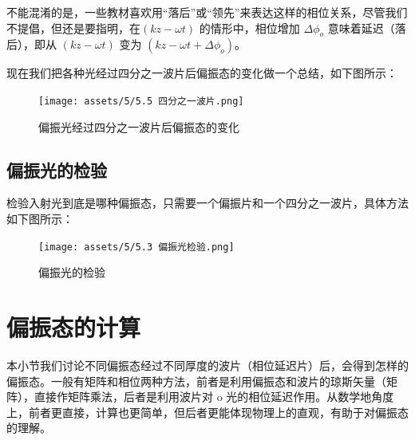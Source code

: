 \documentclass[UTF8]{report}
\theoremstyle{MyLineTheoremStyle} %
\theoremstyle{MyBlockTheoremStyle} %
\theoremstyle{MySubsubsectionStyle} %
\begin{document}
不能混淆的是，一些教材喜欢用“落后”或“领先”来表达这样的相位关系，尽管我们不提倡，但还是要指明，在$(kz - \omega t)$ 的情形中，相位增加 $\Delta \phi_o$ 意味着延迟（落后），即从 $(kz - \omega t)$ 变为 $(kz - \omega t + \Delta \phi_o)$。

现在我们把各种光经过四分之一波片后偏振态的变化做一个总结，如下图所示：
\begin{figure}[H]\centering
    \texttt{[image: assets/5/5.5 四分之一波片.png]}
    \caption{偏振光经过四分之一波片后偏振态的变化}
\end{figure}

\subsection{偏振光的检验}
检验入射光到底是哪种偏振态，只需要一个偏振片和一个四分之一波片，具体方法如下图所示：
\begin{figure}[H]\centering
    \texttt{[image: assets/5/5.3 偏振光检验.png]}
    \caption{偏振光的检验}
\end{figure}

\section{偏振态的计算}
本小节我们讨论不同偏振态经过不同厚度的波片（相位延迟片）后，会得到怎样的偏振态。一般有矩阵和相位两种方法，前者是利用偏振态和波片的琼斯矢量（矩阵），直接作矩阵乘法，后者是利用波片对 o 光的相位延迟作用。从数学地角度上，前者更直接，计算也更简单，但后者更能体现物理上的直观，有助于对偏振态的理解。
\end{document}
